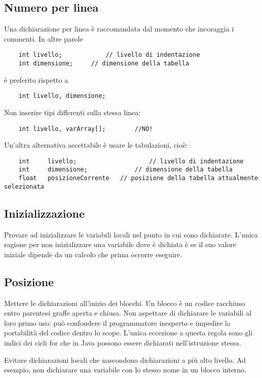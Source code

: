 \subsection{Numero per linea}
Una dichiarazione per linea è raccomandata dal momento che incoraggia i commenti. In altre parole
	\begin{lstlisting}
	int livello;			// livello di indentazione
	int dimensione;		// dimensione della tabella
	\end{lstlisting}
è preferito rispetto a 
	\begin{lstlisting}
	int livello, dimensione;
	\end{lstlisting}
Non inserire tipi differenti sulla stessa linea:
	\begin{lstlisting}
	int livello, varArray[];		//NO!
	\end{lstlisting}
Un'altra alternativa accettabile è usare le tabulazioni, cioè:
\begin{lstlisting}
	int		livello;					// livello di indentazione
	int		dimensione;				// dimensione della tabella
	float	posizioneCorrente	// posizione della tabella attualmente selezionata
	\end{lstlisting}
\subsection{Inizializzazione}
Provare ad inizializzare le variabili locali nel punto in cui sono dichiarate. L'unica ragione per non inizializzare una variabile dove è dichiata è se il suo valore iniziale dipende da un calcolo che prima occorre eseguire.
\subsection{Posizione}
Mettere le dichiarazioni all'inizio dei blocchi. Un blocco è un codice racchiuso entro parentesi graffe aperta e chiusa. Non aspettare di dichiarare le variabili al loro primo uso: può confondere il programmatore inesperto e impedire la portabilità del codice dentro lo scope. L'unica eccezione a questa regola sono gli indici dei cicli for che in Java possono essere dichiarati nell'istruzione stessa.

Evitare dichiarazioni locali che nascondono dichiarazioni a più alto livello. Ad esempio, non dichiarare una variabile con lo stesso nome in un blocco interno.
